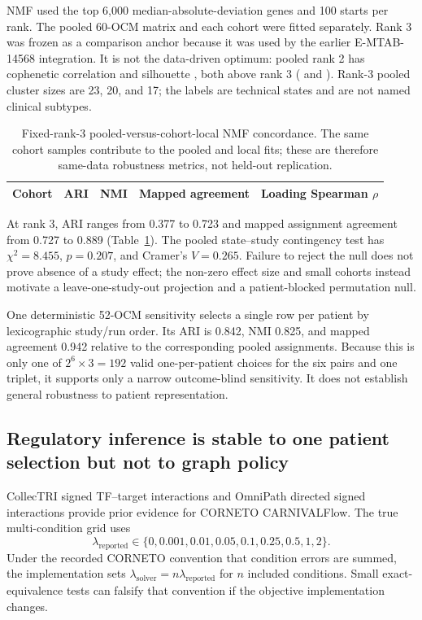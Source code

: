 \documentclass[10pt]{article}
\begin{document}
NMF used the top 6,000 median-absolute-deviation genes and 100 starts per rank.
The pooled 60-OCM matrix and each cohort were fitted separately.  Rank 3 was
frozen as a comparison anchor because it was used by the earlier E-MTAB-14568
integration.  It is not the data-driven optimum: pooled rank 2 has cophenetic
correlation \NmfRankTwoCophenetic{} and silhouette
\NmfRankTwoSilhouette{}, both above rank 3
(\NmfRankThreeCophenetic{} and \NmfRankThreeSilhouette{}).  Rank-3 pooled
cluster sizes are 23, 20, and 17; the labels are technical states and are not
named clinical subtypes.

\begin{table}[t]
\centering
\caption{Fixed-rank-3 pooled-versus-cohort-local NMF concordance.  The same
cohort samples contribute to the pooled and local fits; these are therefore
same-data robustness metrics, not held-out replication.}
\label{tab:nmf}
\begin{tabular}{lrrrr}
\toprule
Cohort & ARI & NMI & Mapped agreement & Loading Spearman $\rho$ \\
\midrule

\bottomrule
\end{tabular}
\end{table}

At rank 3, ARI ranges from 0.377 to 0.723 and mapped assignment agreement from
0.727 to 0.889 (Table~\ref{tab:nmf}).  The pooled state--study contingency test
has $\chi^2=8.455$, $p=0.207$, and Cramer's $V=0.265$.  Failure to reject the
null does not prove absence of a study effect; the non-zero effect size and
small cohorts instead motivate a leave-one-study-out projection and a
patient-blocked permutation null.

One deterministic 52-OCM sensitivity selects a single row per patient by
lexicographic study/run order.  Its ARI is 0.842, NMI 0.825, and mapped
agreement 0.942 relative to the corresponding pooled assignments.  Because
this is only one of $2^6\times3=192$ valid one-per-patient choices for the six
pairs and one triplet, it supports only a narrow outcome-blind sensitivity.
It does not establish general robustness to patient representation.

\subsection{Regulatory inference is stable to one patient selection but not to graph policy}

CollecTRI signed TF--target interactions\cite{collectri} and OmniPath directed
signed interactions\cite{omnipath} provide prior evidence for CORNETO
CARNIVALFlow\cite{liu2019,corneto}.  The true multi-condition grid uses
\[
\lambda_{\mathrm{reported}}\in
\{0,0.001,0.01,0.05,0.1,0.25,0.5,1,2\}.
\]
Under the recorded CORNETO convention that condition errors are summed, the
implementation sets
$\lambda_{\mathrm{solver}}=n\lambda_{\mathrm{reported}}$ for $n$ included
conditions.  Small exact-equivalence tests can falsify that convention if the
objective implementation changes.
\end{document}
